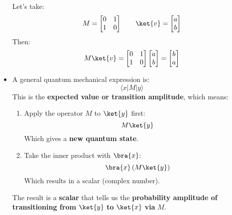 \begin{itemize}
    \begin{examplebox}
        Let's take:
        \begin{equation*}
            M = \begin{bmatrix}
                0 & 1 \\ 1 & 0
            \end{bmatrix}
            \hspace{2em}
            \ket{v} = \begin{bmatrix}
                a \\ b
            \end{bmatrix}
        \end{equation*}
        Then:
        \begin{equation*}
            M \ket{v} = \begin{bmatrix}
                0 & 1 \\ 1 & 0
            \end{bmatrix}
            \begin{bmatrix}
                a \\ b
            \end{bmatrix}
            =
            \begin{bmatrix}
                b \\ a
            \end{bmatrix}
        \end{equation*}
    \end{examplebox}


    \item {}

    A general quantum mechanical expression is:
    \begin{equation*}
        \langle x | M | y \rangle
    \end{equation*}  
    This is the \textbf{expected value or transition amplitude}, which means:
    \begin{enumerate}
        \item Apply the operator $M$ to $\ket{y}$ first:  
        \begin{equation*}
            M \ket{y}
        \end{equation*}
        Which gives a \textbf{new quantum state}.
        \item Take the inner product with $\bra{x}$:  
        \begin{equation*}
            \bra{x} \left(M \ket{y}\right)
        \end{equation*}
        Which results in a scalar (complex number).
    \end{enumerate}
    The result is a \textbf{scalar} that tells us the \textbf{probability amplitude of transitioning from} $\ket{y}$ \textbf{to} $\ket{x}$ \textbf{via} $M$.


\end{itemize}

